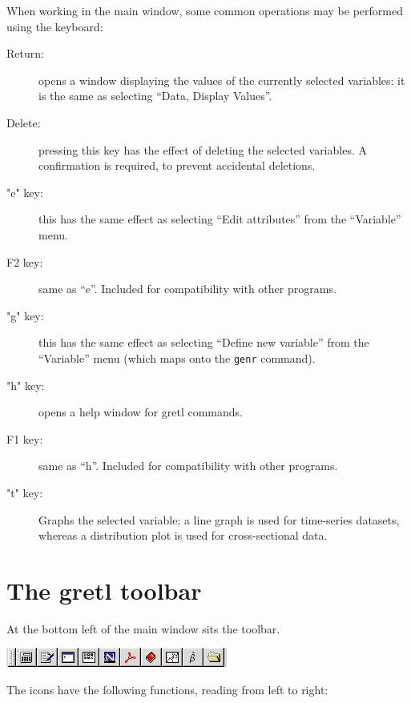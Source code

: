 When working in the main  window, some common operations
may be performed using the keyboard:

\begin{description}
\item[Return:] opens a window displaying the values of the currently
  selected variables: it is the same as selecting ``Data, Display Values''.
\item[Delete:] pressing this key has the effect of deleting the
  selected variables. A confirmation is required, to prevent
  accidental deletions.
\item["e" key:] this has the same effect as selecting ``Edit
  attributes'' from the ``Variable'' menu.
\item[F2 key:] same as ``e''. Included for compatibility with other
  programs.
\item["g" key:] this has the same effect as selecting ``Define new
  variable'' from the ``Variable'' menu (which maps onto the
  \texttt{genr} command).
\item["h" key:] opens a help window for gretl commands.
\item[F1 key:] same as ``h''. Included for compatibility with other
  programs.
\item["t" key:] Graphs the selected variable; a line graph is used for
  time-series datasets, whereas a distribution plot is used for
  cross-sectional data. 
\end{description}


\section{The gretl toolbar}
\label{toolbar}

At the bottom left of the main window sits the toolbar.

\begin{center}
  \includegraphics[scale=0.5]{figures/toolbar}
\end{center}

The icons have the following functions, reading from left to right:

